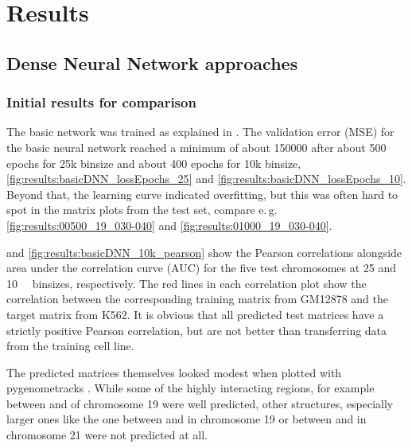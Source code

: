 \section{Results}
\subsection{Dense Neural Network approaches} \label{sec:results:DNN}

\subsubsection{Initial results for comparison} \label{sec:initialDNNresults}
The basic network was trained as explained in \xxx.
The validation error (MSE) for the basic neural network reached a minimum of about \SI{150000}{} 
after about 500 epochs for 25k binsize and about 400 epochs for 10k binsize, \cref{fig:results:basicDNN_lossEpochs_25} and \ref{fig:results:basicDNN_lossEpochs_10}.
Beyond that, the learning curve indicated overfitting, but this was often hard to spot in the matrix plots from the test set, 
compare e.\,g. \cref{fig:results:00500_19_030-040} and \ref{fig:results:01000_19_030-040}.

 and \cref{fig:results:basicDNN_10k_pearson} show the Pearson correlations alongside area under the correlation curve (AUC) for the five test chromosomes
at 25 and \SI{10}{\kilo\bp} binsizes, respectively.
The red lines in each correlation plot show the correlation between the corresponding training matrix from GM12878 and the target matrix from K562.
It is obvious that all predicted test matrices have a strictly positive Pearson correlation, but are not better than transferring data from the training cell line.

The predicted matrices themselves looked modest when plotted with pygenometracks \xxx. 
While some of the highly interacting regions, for example between \xxx and \xxx of chromosome 19 were
well predicted, other structures, especially larger ones like the one between \xxx and \xxx in chromosome 19 
or between \xxx and \xxx in chromosome 21 were not predicted at all.

